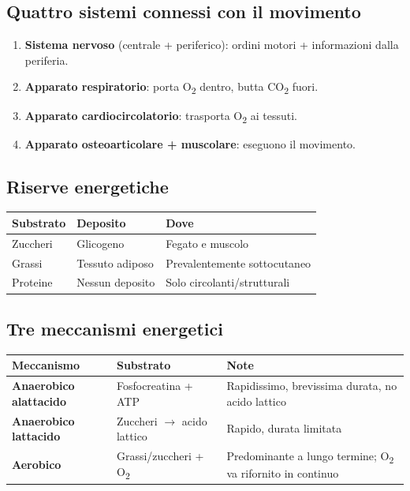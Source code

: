 \documentclass[12pt, a4paper]{article}
\begin{document}
\subsection{Quattro sistemi connessi con il movimento}

\begin{enumerate}
  \item \textbf{Sistema nervoso} (centrale + periferico): ordini motori + informazioni dalla periferia.
  \item \textbf{Apparato respiratorio}: porta O\textsubscript{2} dentro, butta CO\textsubscript{2} fuori.
  \item \textbf{Apparato cardiocircolatorio}: trasporta O\textsubscript{2} ai tessuti.
  \item \textbf{Apparato osteoarticolare + muscolare}: eseguono il movimento.
\end{enumerate}

\subsection{Riserve energetiche}

\begin{tabularx}{\textwidth}{lXl}
\toprule
\rowcolor{light} \textbf{Substrato} & \textbf{Deposito} & \textbf{Dove} \\
\midrule
Zuccheri & Glicogeno & Fegato e muscolo \\
Grassi & Tessuto adiposo & Prevalentemente sottocutaneo \\
Proteine & Nessun deposito & Solo circolanti/strutturali \\
\bottomrule
\end{tabularx}

\subsection{Tre meccanismi energetici}

\begin{tabularx}{\textwidth}{lXX}
\toprule
\rowcolor{light} \textbf{Meccanismo} & \textbf{Substrato} & \textbf{Note} \\
\midrule
\textbf{Anaerobico alattacido} & Fosfocreatina + ATP & Rapidissimo, brevissima durata, no acido lattico \\
\textbf{Anaerobico lattacido} & Zuccheri $\rightarrow$ acido lattico & Rapido, durata limitata \\
\textbf{Aerobico} & Grassi/zuccheri + O\textsubscript{2} & Predominante a lungo termine; O\textsubscript{2} va rifornito in continuo \\
\bottomrule
\end{tabularx}
\end{document}
